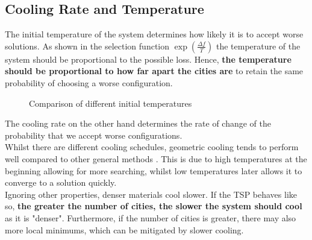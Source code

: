 \documentclass{article}
\begin{document}
\subsection{Cooling Rate and Temperature}

The initial temperature of the system determines how likely it is to accept worse solutions.
As shown in the selection function $\exp(\frac{\Delta f}{T})$ the temperature of the system should be proportional to the possible loss.
Hence, \textbf{the temperature should be proportional to how far apart the cities are} to retain the same probability of choosing a worse configuration.

\begin{figure}[H]
    \centering
    \caption{Comparison of different initial temperatures}
\end{figure}


The cooling rate on the other hand determines the rate of change of the probability that we accept worse configurations.
\\

Whilst there are different cooling schedules, geometric cooling tends to perform well compared to other general methods \cite{cooling}.
This is due to high temperatures at the beginning allowing for more searching, whilst low temperatures later allows it to converge to a solution quickly.
\\

Ignoring other properties, denser materials cool slower.
If the TSP behaves like so, \textbf{the greater the number of cities, the slower the system should cool} as it is "denser".
Furthermore, if the number of cities is greater, there may also more local minimums, which can be mitigated by slower cooling.
\end{document}
